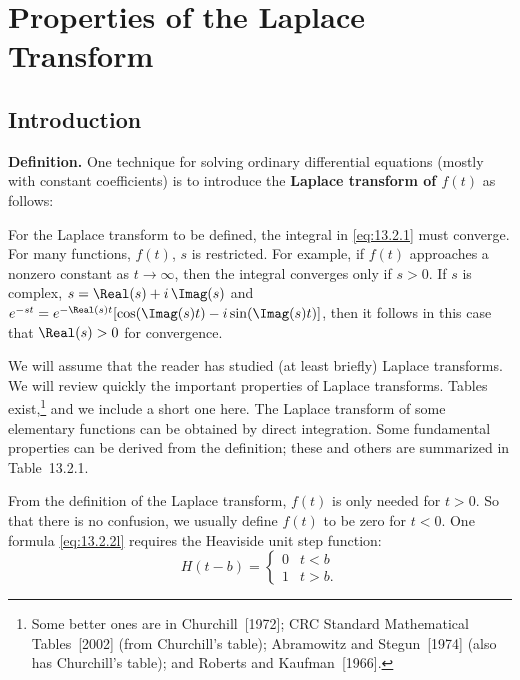 \section{Properties of the Laplace Transform}
\label{sec:13.2}

\subsection{Introduction}
\label{sec:13.2.1}

\textbf{Definition.}
One technique for solving ordinary differential equations (mostly with constant coefficients) is to introduce the \textbf{Laplace transform of $f(t)$} as follows:

For the Laplace transform to be defined, the integral in \eqref{eq:13.2.1} must converge.
For many functions, $f(t)$, $s$ is restricted.  For example, if $f(t)$ approaches a nonzero constant as $t\to\infty$, then the integral converges only if $s>0$.  If $s$ is complex,
$s = \Real(s) + i\,\Imag(s)$ and $e^{-st} = e^{-\Real(s)t}[\cos(\Imag(s)t) - i\sin(\Imag(s)t)]$, then it follows in this case that $\Real(s) > 0$ for convergence.

We will assume that the reader has studied (at least briefly) Laplace transforms.
We will review quickly the important properties of Laplace transforms.  Tables exist,\footnote{Some better ones are in Churchill~[1972]; CRC Standard Mathematical Tables~[2002] (from Churchill's table); Abramowitz and Stegun~[1974] (also has Churchill's table); and Roberts and Kaufman~[1966].} and we include a short one here.  The Laplace transform of some elementary functions can be obtained by direct integration.  Some fundamental properties can be derived from the definition; these and others are summarized in Table~13.2.1.

From the definition of the Laplace transform, $f(t)$ is only needed for $t > 0$.  So that there is no confusion, we usually define $f(t)$ to be zero for $t<0$.  One formula \eqref{eq:13.2.2l} requires the Heaviside unit step function:
\begin{equation}
H(t-b) = \begin{cases} 0 & t < b \\ 1 & t > b. \end{cases}
\label{eq:13.2.2}
\end{equation}


